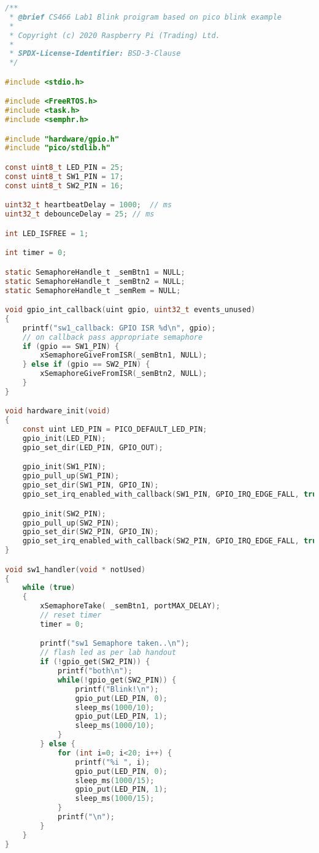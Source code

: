 \documentclass[sigconf]{article}
\begin{document}
\begin{lstlisting}[basicstyle=\footnotesize\ttfamily, language=c,breaklines]
/**
 * @brief CS466 Lab1 Blink proigram based on pico blink example
 * 
 * Copyright (c) 2020 Raspberry Pi (Trading) Ltd.
 *
 * SPDX-License-Identifier: BSD-3-Clause
 */

#include <stdio.h>

#include <FreeRTOS.h>
#include <task.h>
#include <semphr.h>

#include "hardware/gpio.h"
#include "pico/stdlib.h"

const uint8_t LED_PIN = 25;
const uint8_t SW1_PIN = 17;
const uint8_t SW2_PIN = 16;

uint32_t heartbeatDelay = 1000;  // ms
uint32_t debounceDelay = 25; // ms

int LED_ISFREE = 1;

int timer = 0;

static SemaphoreHandle_t _semBtn1 = NULL;
static SemaphoreHandle_t _semBtn2 = NULL;
static SemaphoreHandle_t _semRem = NULL;

void gpio_int_callback(uint gpio, uint32_t events_unused) 
{
    printf("sw1_callback: GPIO ISR %d\n", gpio);
    // on callback pass appropriate semaphore
    if (gpio == SW1_PIN) {
        xSemaphoreGiveFromISR(_semBtn1, NULL);
    } else if (gpio == SW2_PIN) {
        xSemaphoreGiveFromISR(_semBtn2, NULL);
    }
}

void hardware_init(void)
{
    const uint LED_PIN = PICO_DEFAULT_LED_PIN;
    gpio_init(LED_PIN);
    gpio_set_dir(LED_PIN, GPIO_OUT);

    gpio_init(SW1_PIN);
    gpio_pull_up(SW1_PIN);
    gpio_set_dir(SW1_PIN, GPIO_IN);
    gpio_set_irq_enabled_with_callback(SW1_PIN, GPIO_IRQ_EDGE_FALL, true, &gpio_int_callback);

    gpio_init(SW2_PIN);
    gpio_pull_up(SW2_PIN);
    gpio_set_dir(SW2_PIN, GPIO_IN);
    gpio_set_irq_enabled_with_callback(SW2_PIN, GPIO_IRQ_EDGE_FALL, true, &gpio_int_callback);
}

void sw1_handler(void * notUsed)
{
    while (true)
    {
        xSemaphoreTake( _semBtn1, portMAX_DELAY);
        // reset timer
        timer = 0;

        printf("sw1 Semaphore taken..\n");
        // flash led as per lab handout
        if (!gpio_get(SW2_PIN)) {
            printf("both\n");
            while(!gpio_get(SW2_PIN)) {
                printf("Blink!\n");
                gpio_put(LED_PIN, 0);
                sleep_ms(1000/10);
                gpio_put(LED_PIN, 1);
                sleep_ms(1000/10);
            }
        } else {
            for (int i=0; i<20; i++) {
                printf("%i ", i);
                gpio_put(LED_PIN, 0);
                sleep_ms(1000/15);
                gpio_put(LED_PIN, 1);
                sleep_ms(1000/15);
            }
            printf("\n");
        }
    }
}


\end{lstlisting}
\end{document}
